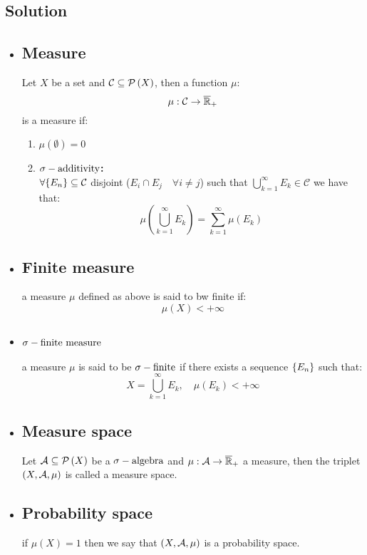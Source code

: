 \subsection*{Solution}
\provdefs
\begin{itemize}
    \item \subsection{Measure} Let $X$ be a set and $\mathcal{C}\subseteq\mathcal{P}\left(X\right)$, then a function $\mu$:
    \[
        \mu:\mathcal{C}\to\overline{\mathbb{R}}_{+}    
    \]
    is a measure if:
    \begin{enumerate}
        \item $\mu(\emptyset)=0$
        \item \textbf{$\sigma-\text{additivity}$:}\\
        $\forall \{ E_n \}\subseteq\mathcal{C}$ disjoint ($E_i\cap E_j\quad \forall i\neq j$) such that $\bigcup_{k=1}^{\infty} E_k \in \mathcal{C}$ we have that:
        \[
            \mu \left( \bigcup_{k=1}^{\infty} E_k \right) = \sum_{k=1}^{\infty} \mu(E_k) 
        \]
    \end{enumerate}
    \item \subsection{Finite measure} a measure $\mu$ defined as above is said to bw finite if:
    \[
        \mu(X) < + \infty    
    \]
    \item \subsection{\texorpdfstring{$\sigma-\text{finite measure}$}{Sigma-finite measure}} a measure $\mu$ is said to be $\sigma-\text{finite}$ if there exists a sequence $\{ E_n \}$ such that:
    \[
        X = \bigcup_{k=1}^\infty E_k, \quad \mu(E_k) <+\infty
    \]
    \item \subsection{Measure space} Let $\mathcal{A}\subseteq\mathcal{P}\left(X\right)$ be a $\sigma-\text{algebra}$ and $\mu:\mathcal{A}\to\overline{\mathbb{R}}_{+}$ a measure, then the triplet $(X,\mathcal{A},\mu)$ is called  a measure space.
    \item \subsection{Probability space} if $\mu(X)=1$ then we say that $(X,\mathcal{A},\mu)$ is a probability space.
\end{itemize}

